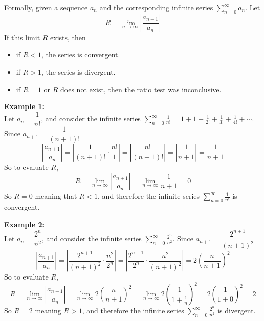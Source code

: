 \documentclass[11pt,a4paper,titlepage,oneside,openany]{article}
\begin{document}
Formally, given a sequence $a_n$ and the corresponding infinite series $\displaystyle \sum_{n=0}^\infty a_n$. Let
\begin{equation*}
  R=\lim_{n \to \infty} \left|\frac{a_{n+1}}{a_n}\right|
\end{equation*}
If this limit $R$ exists, then
\begin{itemize}
\item if $R<1$, the series is convergent.
\item if $R>1$, the series is divergent.
\item if $R=1$ or $R$ does not exist, then the ratio test was inconclusive.
\end{itemize}
\noindent  \textbf{Example 1:}\\
Let $a_n=\dfrac{1}{n!}$, and consider the infinite series $\displaystyle \sum_{n=0}^{\infty} \frac{1}{n!} = 1+1+\frac{1}{2!}+\frac{1}{3!}+\frac{1}{4!}+\cdots$. Since $a_{n+1}=\dfrac{1}{(n+1)!}$
\begin{equation*}
  \left| \frac{a_{n+1}}{a_n}\right|=\left| \frac{1}{(n+1)!}\cdot \frac{n!}{1}\right|=\left| \frac{n!}{(n+1)!}\right|=\left| \frac{1}{n+1}\right|=\frac{1}{n+1}
\end{equation*}
So to evaluate $R$,
\begin{equation*}
  R=\lim_{n \to \infty} \left|\frac{a_{n+1}}{a_n}\right|=\lim_{n \to \infty} \frac{1}{n+1}=0
\end{equation*}
So $R=0$ meaning that $R<1$, and therefore the infinite series $ \sum_{n=0}^{\infty} \frac{1}{n!}$ is convergent.

\noindent  \textbf{Example 2:}\\
Let $a_n=\dfrac{2^n}{n^2}$, and consider the infinite series $\displaystyle \sum_{n=0}^{\infty} \frac{2^n}{n^2}$. Since $a_{n+1}=\dfrac{2^{n+1}}{(n+1)^2}$
\begin{equation*}
  \left| \frac{a_{n+1}}{a_n}\right|=\left| \frac{2^{n+1}}{(n+1)^2}\cdot \frac{n^2}{2^n}\right|=\left| \frac{2^{n+1}}{2^n}\cdot\frac{n^2}{(n+1)^2}\right|=2 \left(\frac{n}{n+1}\right)^2
\end{equation*}
So to evaluate $R$,
\begin{equation*}
  R=\lim_{n \to \infty} \left|\frac{a_{n+1}}{a_n}\right|=\lim_{n \to \infty} 2 \left(\frac{n}{n+1}\right)^2=\lim_{n \to \infty} 2 \left(\frac{1}{1+\frac{1}{n}}\right)^2=2\left(\frac{1}{1+0}\right)^2=2
\end{equation*}
So $R=2$ meaning $R>1$, and therefore the infinite series $\displaystyle \sum_{n=0}^{\infty} \frac{2^n}{n^2}$ is divergent.
\end{document}
